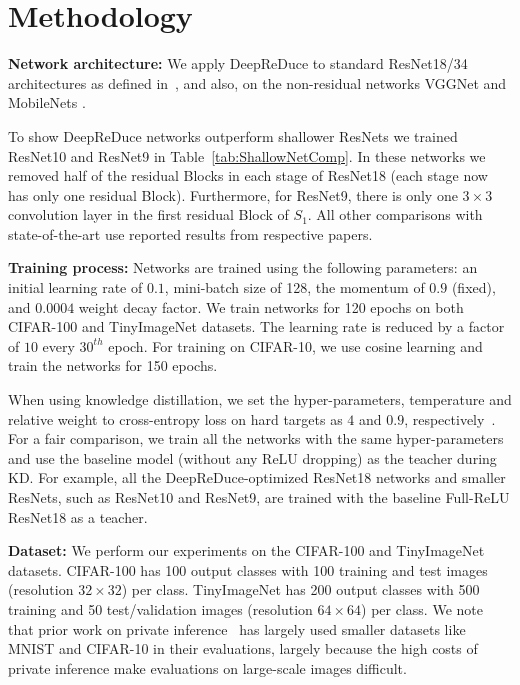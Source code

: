 \section{Methodology}
\label{sec:Methodology}

{\bf Network architecture:}
We apply DeepReDuce to standard ResNet18/34 architectures as defined in~\cite{he2016deep}, and also, on the non-residual networks VGGNet \cite{simonyan2014very} and MobileNets \cite{howard2017mobilenets}. 

To show DeepReDuce networks outperform shallower ResNets we trained
ResNet10 and ResNet9 in Table~\ref{tab:ShallowNetComp}.
In these networks we removed half of the residual Blocks in each stage of ResNet18
(each stage now has only one residual Block).
Furthermore, for ResNet9, there is only one $3\times3$ convolution layer in the first residual Block of $S_1$.  
All other comparisons with state-of-the-art use reported results from respective papers.
 

  

{\bf Training process:}
Networks are trained using the following parameters:
an initial learning rate of $0.1$, 
mini-batch size of 128,
the momentum of $0.9$ (fixed), and 
$0.0004$ weight decay factor. 
We train networks for 120 epochs on both CIFAR-100 and TinyImageNet datasets. 
The learning rate is reduced by a factor of $10$ every $30^{th}$ epoch. For training on CIFAR-10, we use cosine learning and train the networks for 150 epochs. 

When using knowledge distillation, we set the hyper-parameters,
temperature and relative weight to cross-entropy loss on hard targets 
as $4$ and $0.9$, respectively~\cite{hinton2015distilling,zagoruyko2016paying,cho2019efficacy}. 
For a fair comparison, we train all the networks with the same hyper-parameters 
and use the baseline model (without any ReLU dropping) as the teacher during KD.
For example, all the DeepReDuce-optimized ResNet18 networks and smaller ResNets,
such as ResNet10 and ResNet9, are trained with the baseline Full-ReLU ResNet18 as a teacher.



{\bf Dataset:}
We perform our experiments on the CIFAR-100 \cite{2012KrizhevskyCIFAR} and TinyImageNet \cite{le2015tiny,yao2015tiny} datasets.  
CIFAR-100 has 100 output classes with 100 training and test images (resolution $32\times32$) per class.
TinyImageNet has 200 output classes with 500 training and 50 test/validation images (resolution $64\times64$) per class. 
We note that prior work on private inference~\cite{mishra2020delphi} has largely used smaller datasets like MNIST and CIFAR-10 in their evaluations, largely because the high costs of private inference make evaluations on large-scale images difficult.

